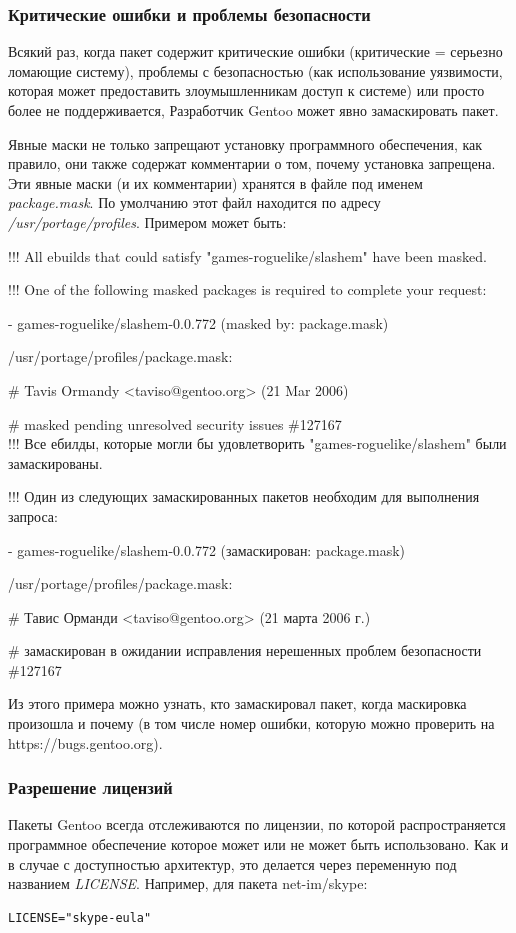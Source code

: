\documentclass[10pt]{book}
\begin{document}
\subsubsection{Критические ошибки и проблемы безопасности}

Всякий раз, когда пакет содержит критические ошибки (критические = серьезно ломающие систему), проблемы с безопасностью (как использование уязвимости, которая может предоставить злоумышленникам доступ к системе) или просто более не поддерживается, Разработчик Gentoo может явно замаскировать пакет.

Явные маски не только запрещают установку программного обеспечения, как правило, они также содержат комментарии о том, почему установка запрещена. Эти явные маски (и их комментарии) хранятся в файле под именем \textit{package.mask}. По умолчанию этот файл находится по адресу \textit{/usr/portage/profiles}.
Примером может быть:

\begin{tcolorbox}
!!! All ebuilds that could satisfy "games-roguelike/slashem" have been masked.

!!! One of the following masked packages is required to complete your request:

- games-roguelike/slashem-0.0.772 (masked by: package.mask)

/usr/portage/profiles/package.mask:

\# Tavis Ormandy <taviso@gentoo.org> (21 Mar 2006)

\# masked pending unresolved security issues \#127167\\

!!! Все ебилды, которые могли бы удовлетворить "games-roguelike/slashem" были замаскированы.

!!! Один из следующих замаскированных пакетов необходим для выполнения запроса:

- games-roguelike/slashem-0.0.772 (замаскирован: package.mask)

/usr/portage/profiles/package.mask:

\# Тавис Орманди <taviso@gentoo.org> (21 марта 2006 г.)

\# замаскирован в ожидании исправления нерешенных проблем безопасности \#127167
\end{tcolorbox}

Из этого примера можно узнать, кто замаскировал пакет, когда маскировка произошла и почему (в том числе номер ошибки, которую можно проверить на https://bugs.gentoo.org).

\subsubsection{Разрешение лицензий}
Пакеты Gentoo всегда отслеживаются по лицензии, по которой распространяется программное обеспечение которое может или  не может быть использовано. Как и в случае с доступностью архитектур, это делается через переменную под названием \textit{LICENSE}. Например, для пакета net-im/skype:
\begin{tcolorbox}
\begin{lstlisting}
LICENSE="skype-eula"
\end{lstlisting}
\end{tcolorbox}
\end{document}
